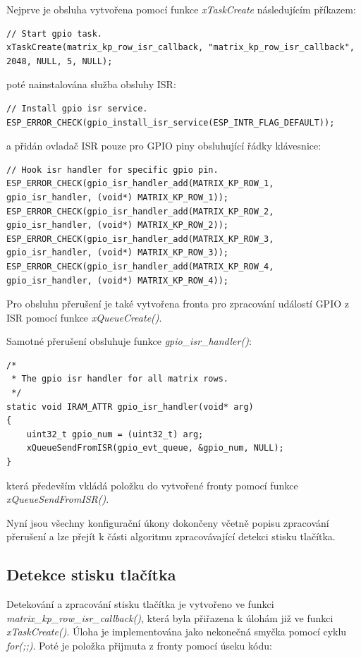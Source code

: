 \documentclass[a4paper, 12pt]{article}
\begin{document}
Nejprve je obsluha vytvořena pomocí funkce \textit{xTaskCreate} následujícím příkazem:

\begin{lstlisting}[style=CLanguage]
// Start gpio task.    
xTaskCreate(matrix_kp_row_isr_callback, "matrix_kp_row_isr_callback", 2048, NULL, 5, NULL);
\end{lstlisting}

poté nainstalována služba obsluhy ISR:

\begin{lstlisting}[style=CLanguage]
// Install gpio isr service.
ESP_ERROR_CHECK(gpio_install_isr_service(ESP_INTR_FLAG_DEFAULT));
\end{lstlisting}

a přidán ovladač ISR pouze pro GPIO piny obsluhující řádky klávesnice:

\begin{lstlisting}[style=CLanguage]
// Hook isr handler for specific gpio pin.
ESP_ERROR_CHECK(gpio_isr_handler_add(MATRIX_KP_ROW_1, gpio_isr_handler, (void*) MATRIX_KP_ROW_1));
ESP_ERROR_CHECK(gpio_isr_handler_add(MATRIX_KP_ROW_2, gpio_isr_handler, (void*) MATRIX_KP_ROW_2));
ESP_ERROR_CHECK(gpio_isr_handler_add(MATRIX_KP_ROW_3, gpio_isr_handler, (void*) MATRIX_KP_ROW_3));
ESP_ERROR_CHECK(gpio_isr_handler_add(MATRIX_KP_ROW_4, gpio_isr_handler, (void*) MATRIX_KP_ROW_4));
\end{lstlisting}

Pro obsluhu přerušení je také vytvořena fronta pro zpracování událostí GPIO z ISR pomocí funkce \textit{xQueueCreate()}.

Samotné přerušení obsluhuje funkce \textit{gpio\_isr\_handler()}:

\begin{lstlisting}[style=CLanguage]
/*
 * The gpio isr handler for all matrix rows.
 */
static void IRAM_ATTR gpio_isr_handler(void* arg)
{
    uint32_t gpio_num = (uint32_t) arg;
    xQueueSendFromISR(gpio_evt_queue, &gpio_num, NULL);    
}
\end{lstlisting}

která především vkládá položku do vytvořené fronty pomocí funkce \textit{xQueueSendFromISR()}.

Nyní jsou všechny konfigurační úkony dokončeny včetně popisu zpracování přerušení a lze přejít k části algoritmu zpracovávající detekci stisku tlačítka.

\subsection{Detekce stisku tlačítka}
Detekování a zpracování stisku tlačítka je vytvořeno ve funkci \textit{matrix\_kp\_row\_isr\_callback()}, která byla přiřazena k úlohám již ve funkci \textit{xTaskCreate()}. Úloha je implementována jako nekonečná smyčka pomocí cyklu \textit{for(;;)}. Poté je položka přijmuta z fronty pomocí úseku kódu:
\end{document}
